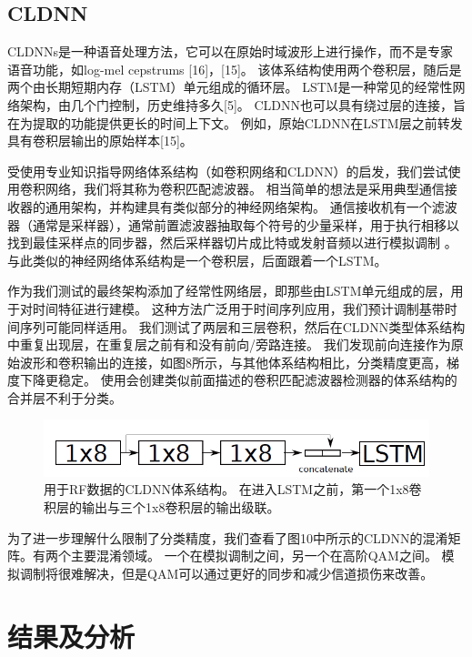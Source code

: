 \subsection{CLDNN}

CLDNNs是一种语音处理方法，它可以在原始时域波形上进行操作，而不是专家语音功能，如log-mel cepstrums [16]，[15]。 该体系结构使用两个卷积层，随后是两个由长期短期内存（LSTM）单元组成的循环层。 LSTM是一种常见的经常性网络架构，由几个门控制，历史维持多久[5]。 CLDNN也可以具有绕过层的连接，旨在为提取的功能提供更长的时间上下文。 例如，原始CLDNN在LSTM层之前转发具有卷积层输出的原始样本[15]。\par

受使用专业知识指导网络体系结构（如卷积网络和CLDNN）的启发，我们尝试使用卷积网络，我们将其称为卷积匹配滤波器。 相当简单的想法是采用典型通信接收器的通用架构，并构建具有类似部分的神经网络架构。 通信接收机有一个滤波器（通常是采样器），通常前置滤波器抽取每个符号的少量采样，用于执行相移以找到最佳采样点的同步器，然后采样器切片成比特或发射音频以进行模拟调制 。与此类似的神经网络体系结构是一个卷积层，后面跟着一个LSTM。\par

作为我们测试的最终架构添加了经常性网络层，即那些由LSTM单元组成的层，用于对时间特征进行建模。 这种方法广泛用于时间序列应用，我们预计调制基带时间序列可能同样适用。 我们测试了两层和三层卷积，然后在CLDNN类型体系结构中重复出现层，在重复层之前有和没有前向/旁路连接。 我们发现前向连接作为原始波形和卷积输出的连接，如图8所示，与其他体系结构相比，分类精度更高，梯度下降更稳定。 使用会创建类似前面描述的卷积匹配滤波器检测器的体系结构的合并层不利于分类。\par
\begin{figure}[!h]
	\centering
	\includegraphics[scale=1]{figures/chapter_5/fig6}
	\caption{用于RF数据的CLDNN体系结构。 在进入LSTM之前，第一个1x8卷积层的输出与三个1x8卷积层的输出级联。}
\end{figure}

为了进一步理解什么限制了分类精度，我们查看了图10中所示的CLDNN的混淆矩阵。有两个主要混淆领域。 一个在模拟调制之间，另一个在高阶QAM之间。 模拟调制将很难解决，但是QAM可以通过更好的同步和减少信道损伤来改善。\par
\section{结果及分析}

